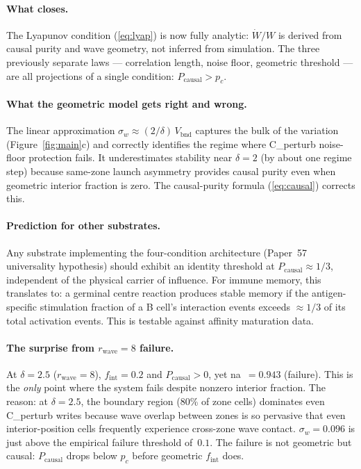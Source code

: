 \documentclass[11pt,a4paper]{article}
\newcommand{\sw}{\sigma_w}
\newcommand{\fint}{f_{\mathrm{int}}}
\newcommand{\Pcausal}{P_{\mathrm{causal}}}
\begin{document}
\paragraph{What closes.}
The Lyapunov condition (\ref{eq:lyap}) is now fully analytic:
$\dot{W}/W$ is derived from causal purity and wave geometry,
not inferred from simulation.
The three previously separate laws — correlation length, noise floor, geometric
threshold — are all projections of a single condition: $\Pcausal > p_c$.

\paragraph{What the geometric model gets right and wrong.}
The linear approximation $\sw \approx (2/\delta)\,V_\mathrm{bnd}$ captures the
bulk of the variation (Figure~\ref{fig:main}c) and correctly identifies the
regime where C\_perturb noise-floor protection fails.
It underestimates stability near $\delta=2$ (by about one regime step)
because same-zone launch asymmetry provides causal purity even when geometric
interior fraction is zero.
The causal-purity formula (\ref{eq:causal}) corrects this.

\paragraph{Prediction for other substrates.}
Any substrate implementing the four-condition architecture (Paper~57
universality hypothesis) should exhibit an identity threshold at
$\Pcausal \approx 1/3$, independent of the physical carrier of influence.
For immune memory, this translates to: a germinal centre reaction produces
stable memory if the antigen-specific stimulation fraction of a B cell's
interaction events exceeds $\approx 1/3$ of its total activation events.
This is testable against affinity maturation data.

\paragraph{The surprise from $r_\mathrm{wave}=8$ failure.}
At $\delta=2.5$ ($r_\mathrm{wave}=8$), $\fint=0.2$ and $\Pcausal>0$, yet
na~$=0.943$ (failure). This is the \emph{only} point where the system fails
despite nonzero interior fraction. The reason: at $\delta=2.5$, the boundary
region (80\% of zone cells) dominates even C\_perturb writes because wave
overlap between zones is so pervasive that even interior-position cells
frequently experience cross-zone wave contact. $\sw=0.096$ is just above
the empirical failure threshold of~$0.1$.
The failure is not geometric but causal: $\Pcausal$ drops below $p_c$
before geometric $\fint$ does.
\end{document}
